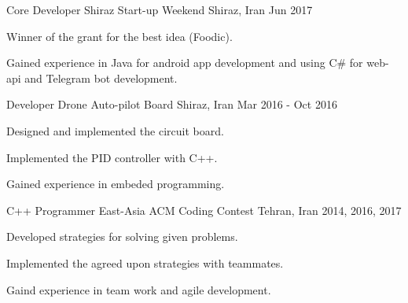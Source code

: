 

\vspace{-3mm}
\begin{minipage}[t]{0.49\textwidth}
  
\begin{cventries}
  \cventry
    {Core Developer} %
    {Shiraz Start-up Weekend} %
    {Shiraz, Iran} %
    {Jun 2017} %
    {
      \begin{cvitems} %
        \item {Winner of the grant for the best idea (Foodic).}
        \item {Gained experience in Java for android app development and using C\# for web-api and Telegram bot development.}
      \end{cvitems}
    }

  \cventry
    {Developer} %
    {Drone Auto-pilot Board} %
    {Shiraz, Iran} %
    {Mar 2016 - Oct 2016} %
    {
      \begin{cvitems} %
        \item {Designed and implemented the circuit board.}
        \item {Implemented the PID controller with C++.}
        \item {Gained experience in embeded programming.}
      \end{cvitems}
      }
  \end{cventries}
\end{minipage}
\hspace{0.02\textwidth}
\begin{minipage}[t]{0.49\textwidth}
\begin{cventries}
  \cventry
    {C++ Programmer} %
    {East-Asia ACM Coding Contest} %
    {Tehran, Iran} %
    {2014, 2016, 2017} %
    {
      \begin{cvitems} %
        \item {Developed strategies for solving given problems.}
        \item {Implemented the agreed upon strategies with teammates.}
        \item {Gaind experience in team work and agile development.}
      \end{cvitems}
    }
\
\end{cventries}
\end{minipage}\\
